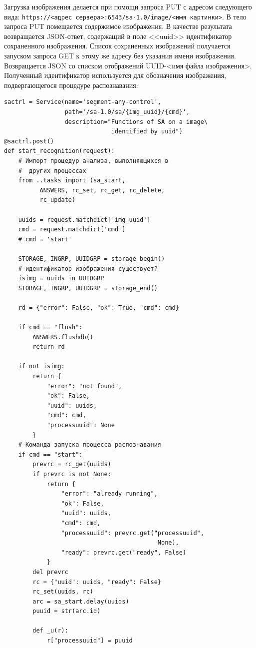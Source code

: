 \documentclass[732,fontsize=14pt,final]{studrep}
\begin{document}
Загрузка изображения делается при помощи запроса PUT с адресом следующего вида: \verb|https://<адрес сервера>:6543/sa-1.0/image/<имя картинки>|. В тело запроса PUT помещается содержимое изображения. В качестве результата возвращается JSON-ответ, содержащий в поле <<uuid>> идентификатор сохраненного изображения. Список сохраненных изображений получается запуском запроса GET к этому же адресу без указания имени изображения. Возвращается JSON со списком отображений UUID-<имя файла изображения>. Полученный идентификатор используется для обозначения изображения, подвергающегося процедуре распознавания:

\begin{verbatim}
sactrl = Service(name='segment-any-control',
                 path='/sa-1.0/sa/{img_uuid}/{cmd}',
                 description="Functions of SA on a image\
                              identified by uuid")
@sactrl.post()
def start_recognition(request):
    # Импорт процедур анализа, выполняющихся в
    #  других процессах
    from ..tasks import (sa_start,
          ANSWERS, rc_set, rc_get, rc_delete,
          rc_update)

    uuids = request.matchdict['img_uuid']
    cmd = request.matchdict['cmd']
    # cmd = 'start'

    STORAGE, INGRP, UUIDGRP = storage_begin()
    # идентификатор изображения существует?
    isimg = uuids in UUIDGRP
    STORAGE, INGRP, UUIDGRP = storage_end()

    rd = {"error": False, "ok": True, "cmd": cmd}

    if cmd == "flush":
        ANSWERS.flushdb()
        return rd

    if not isimg:
        return {
            "error": "not found",
            "ok": False,
            "uuid": uuids,
            "cmd": cmd,
            "processuuid": None
        }
    # Команда запуска процесса распознавания
    if cmd == "start":
        prevrc = rc_get(uuids)
        if prevrc is not None:
            return {
                "error": "already running",
                "ok": False,
                "uuid": uuids,
                "cmd": cmd,
                "processuuid": prevrc.get("processuuid",
                                           None),
                "ready": prevrc.get("ready", False)
            }
        del prevrc
        rc = {"uuid": uuids, "ready": False}
        rc_set(uuids, rc)
        arc = sa_start.delay(uuids)
        puuid = str(arc.id)

        def _u(r):
            r["processuuid"] = puuid


\end{verbatim}
\end{document}
